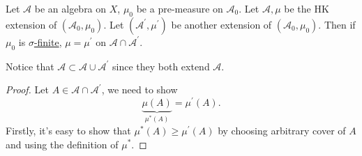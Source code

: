 \begin{theorem}
	Let \(\mathcal{A}\) be an algebra on \(X\), \(\mu _0\) be a pre-measure on \(\mathcal{A} _0\). Let \(\mathcal{A} , \mu \)
	be the HK extension of \((\mathcal{A} _0, \mu _0)\). Let \((\mathcal{A} ^\prime , \mu ^\prime )\) be another extension of \((\mathcal{A} _0, \mu _0)\).
	Then if \(\mu _0\) is \hyperref[def:finite-measure]{\(\sigma\)-finite}, \(\mu  = \mu ^\prime \) on \(\mathcal{A} \cap \mathcal{A} ^\prime \).
\end{theorem}
\begin{note}
	Notice that \(\mathcal{A} \subset \mathcal{A} \cup \mathcal{A} ^\prime \) since they both extend \(\mathcal{A} \).
\end{note}
\begin{proof}
	Let \(A\in \mathcal{A} \cap \mathcal{A} ^\prime \), we need to show
	\[
		\underbrace{\mu (A)}_{\mu ^{*} (A)} = \mu ^\prime (A).
	\]
	Firstly, it's easy to show that \(\mu ^{*} (A)\geq \mu ^\prime (A)\) by choosing arbitrary cover of \(A\) and using the definition of
	\(\mu ^{*} \).


\end{proof}
